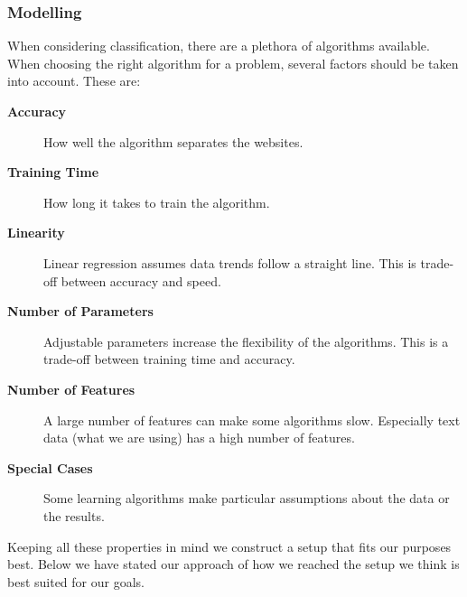 \subsubsection{Modelling}
When considering classification, there are a plethora of algorithms available. When choosing the right algorithm for a problem, several factors should be taken into account\cite{MLCheatSheet}. These are:
    \begin{description}
        \item[\textbf{Accuracy}] How well the algorithm separates the websites.
        \item[\textbf{Training Time}] How long it takes to train the algorithm.
        \item[\textbf{Linearity}] Linear regression assumes data trends follow a straight line. This is trade-off between accuracy and speed.
        \item[\textbf{Number of Parameters}] Adjustable parameters increase the flexibility of the algorithms. This is a trade-off between training time and accuracy.
        \item[\textbf{Number of Features}] A large number of features can make some algorithms slow. Especially text data (what we are using) has a high number of features.
        \item[\textbf{Special Cases}] Some learning algorithms make particular assumptions about the data or the results.
    \end{description}

Keeping all these properties in mind we construct a setup that fits our purposes best.
Below we have stated our approach of how we reached the setup we think is best suited for our goals.


